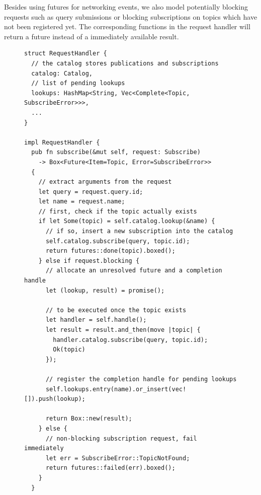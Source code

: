 Besides using futures for networking events, we also model potentially
blocking requests such as query submissions or blocking subscriptions on
topics which have not been registered yet. The corresponding functions in the
request handler will return a future instead of a immediately available
result. 


\begin{figure}[p]
\begin{lstlisting}[caption={[Handler for blocking subscription requests]
Example how a future is created for the subscription request. Depending
on whether it can be served immediately or not, different kinds of futures
are returned. Bookkeeping for still pending requests is done with completion
handles. Upon publication of a requested topic, any pending subscriptions will
be completed by calling \lstinline{lookup.complete()}.}]
struct RequestHandler {
  // the catalog stores publications and subscriptions
  catalog: Catalog,
  // list of pending lookups
  lookups: HashMap<String, Vec<Complete<Topic, SubscribeError>>>,
  ...
}

impl RequestHandler {
  pub fn subscribe(&mut self, request: Subscribe)
    -> Box<Future<Item=Topic, Error=SubscribeError>>
  {
    // extract arguments from the request
    let query = request.query.id;
    let name = request.name;
    // first, check if the topic actually exists
    if let Some(topic) = self.catalog.lookup(&name) {
      // if so, insert a new subscription into the catalog
      self.catalog.subscribe(query, topic.id);
      return futures::done(topic).boxed();
    } else if request.blocking {
      // allocate an unresolved future and a completion handle
      let (lookup, result) = promise();

      // to be executed once the topic exists
      let handler = self.handle();
      let result = result.and_then(move |topic| {
        handler.catalog.subscribe(query, topic.id);
        Ok(topic)
      });

      // register the completion handle for pending lookups
      self.lookups.entry(name).or_insert(vec![]).push(lookup);

      return Box::new(result);
    } else {
      // non-blocking subscription request, fail immediately
      let err = SubscribeError::TopicNotFound;
      return futures::failed(err).boxed();
    }
  }
\end{lstlisting}
\end{figure}


